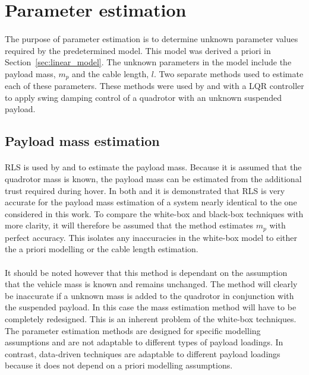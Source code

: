 \section{Parameter estimation} \label{sec:param_estimation}

    \paragraph{}
    The purpose of parameter estimation is to determine unknown parameter values required by the predetermined model.
    This model was derived a priori in Section~\ref{sec:linear_model}.
    The unknown parameters in the model include the payload mass, $m_p$ and the cable length, $l$.
    Two separate methods used to estimate each of these parameters.
    These methods were used by \cite{Erasmus2020} and \cite{Slabber2020} 
    with a LQR controller to apply swing damping control of a quadrotor with an unknown suspended payload.
    
\subsection{Payload mass estimation}

    \paragraph{}
    RLS is used by \cite{Erasmus2020} and \cite{Slabber2020} to estimate the payload mass.
    Because it is assumed that the quadrotor mass is known, 
    the payload mass can be estimated from the additional trust required during hover.
    In both \cite{Erasmus2020} and \cite{Slabber2020} it is demonstrated 
    that RLS is very accurate for the payload mass estimation of a system nearly identical to the one considered in this work.
    To compare the white-box and black-box techniques with more clarity, 
    it will therefore be assumed that the method estimates $m_p$ with perfect accuracy.
    This isolates any inaccuracies in the white-box model to 
    either the a priori modelling or the cable length estimation.

    \paragraph{}
    It should be noted however that this method is dependant on the assumption 
    that the vehicle mass is known and remains unchanged.
    The method will clearly be inaccurate if a unknown mass is added to the quadrotor 
    in conjunction with the suspended payload.
    In this case the mass estimation method will have to be completely redesigned.
    This is an inherent problem of the white-box techniques.
    The parameter estimation methods are designed for specific modelling assumptions 
    and are not adaptable to different types of payload loadings.
    In contrast, data-driven techniques are adaptable to different payload loadings 
    because it does not depend on a priori modelling assumptions.

